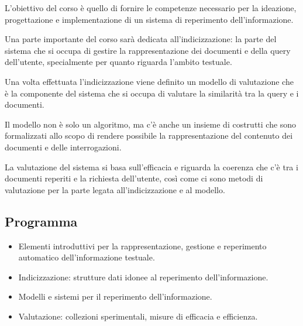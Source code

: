 L'obiettivo del corso è quello di fornire le competenze necessario per la ideazione, progettazione e implementazione di un sistema di reperimento dell'informazione.

Una parte importante del corso sarà dedicata all'indicizzazione: la parte del sistema che si occupa di gestire la rappresentazione dei documenti e della query dell'utente, specialmente per quanto riguarda l'ambito testuale.

Una volta effettuata l'indicizzazione viene definito un modello di valutazione che è la componente del sistema che si occupa di valutare la similarità tra la query e i documenti.

Il modello non è solo un algoritmo, ma c'è anche un insieme di costrutti che sono formalizzati allo scopo di rendere possibile la rappresentazione del contenuto dei documenti e delle interrogazioni. 

La valutazione del sistema si basa sull'efficacia e riguarda la coerenza che c'è tra i documenti reperiti e la richiesta dell'utente, così come ci sono metodi di valutazione per la parte legata all'indicizzazione e al modello.

\subsection{Programma}

\begin{itemize}
	\item Elementi introduttivi per la rappresentazione, gestione e reperimento automatico dell'informazione testuale.
	\item Indicizzazione: strutture dati idonee al reperimento dell'informazione.
	\item Modelli e sistemi per il reperimento dell'informazione.
	\item Valutazione: collezioni sperimentali, misure di efficacia e efficienza.
\end{itemize}
